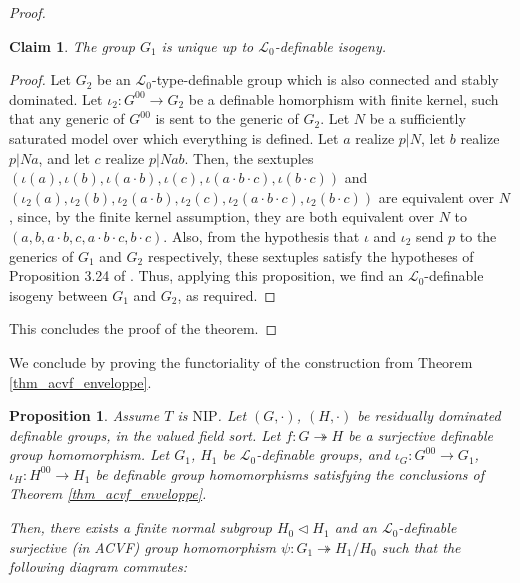 \documentclass[12pt]{article}
\newcommand{\NIP}{\mathrm{NIP}}
\newcommand{\0}{\emptyset}
\theoremstyle{plain}%
\newtheorem{prop}[thm]{Proposition}
\newtheorem{claim}{Claim}
\theoremstyle{definition}
\theoremstyle{remark}
\begin{document}
\begin{proof}
\begin{claim}
    The group $G_1$ is unique up to $\mathcal{L}_0$-definable isogeny.
\end{claim}
\begin{proof}
    Let $G_2$ be an $\mathcal{L}_0$-type-definable group which is also connected and stably dominated. Let $\iota_2 : G^{00} \rightarrow G_2$ be a definable homorphism with finite kernel, such that any generic of $G^{00}$ is sent to the generic of $G_2$. Let $N$ be a sufficiently saturated model over which everything is defined. Let $a$ realize $p|N$, let $b$ realize $p|Na$, and let $c$ realize $p|Nab$. Then, the sextuples $(\iota(a), \iota(b), \iota(a\cdot b), \iota(c), \iota(a\cdot b \cdot c), \iota(b \cdot c))$ and $(\iota_2(a), \iota_2(b), \iota_2(a\cdot b), \iota_2(c), \iota_2(a\cdot b \cdot c), \iota_2(b \cdot c))$ are equivalent over $N$, since, by the finite kernel assumption, they are both equivalent over $N$ to $(a, b, a\cdot b, c, a\cdot b \cdot c, b \cdot c)$. Also, from the hypothesis that $\iota$ and $\iota_2$ send $p$ to the generics of $G_1$ and $G_2$ respectively, these sextuples satisfy the hypotheses of Proposition 3.24 of \cite{Wang_group_config}. Thus, applying this proposition, we find an $\mathcal{L}_0$-definable isogeny between $G_1$ and $G_2$, as required. \end{proof}

This concludes the proof of the theorem. \end{proof}

We conclude by proving the functoriality of the construction from Theorem \ref{thm_acvf_enveloppe}.

\begin{prop}\label{prop_functoriality} Assume $T$ is $\NIP$. Let $(G, \cdot)$, $(H, \cdot)$ be residually dominated definable groups, in the valued field sort. Let $f: G \twoheadrightarrow H$ be a surjective definable group homomorphism. Let $G_1$, $H_1$ be $\mathcal{L}_0$-definable groups, and $\iota_G: G^{00} \rightarrow G_1$, $\iota_H: H^{00} \rightarrow H_1$ be definable group homomorphisms satisfying the conclusions of Theorem \ref{thm_acvf_enveloppe}.


Then, there exists a finite normal subgroup $H_0 \lhd H_1$ and an $\mathcal{L}_0$-definable surjective (in ACVF) group homomorphism $\psi: G_1 \twoheadrightarrow H_1 / H_0$ such that the following diagram commutes:

\begin{center}
\end{center}

\end{prop}
\end{document}
